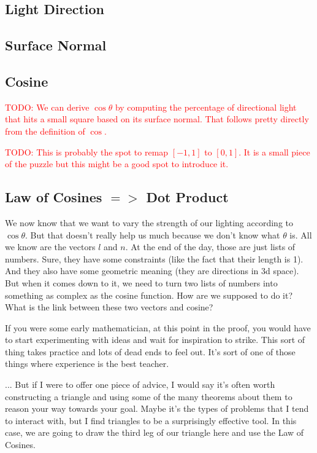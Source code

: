 \documentclass{article}
\newcommand\todo[1]{\textcolor{red}{TODO: #1}}
\begin{document}
\subsection{Light Direction}

\subsection{Surface Normal}

\subsection{Cosine}

\todo{We can derive $\cos \theta$ by computing the percentage of directional light that hits a small square based on its surface normal.
That follows pretty directly from the definition of $\cos$.}

\todo{This is probably the spot to remap $[-1, 1]$ to $[0, 1]$. It is a small piece of the puzzle but this might be a good spot to introduce it.}

\subsection{Law of Cosines $=>$ Dot Product}

We now know that we want to vary the strength of our lighting according to $\cos \theta$.
But that doesn't really help us much because we don't know what $\theta$ is.
All we know are the vectors $l$ and $n$.
At the end of the day, those are just lists of numbers.
Sure, they have some constraints (like the fact that their length is 1).
And they also have some geometric meaning (they are directions in 3d space).
But when it comes down to it, we need to turn two lists of numbers into something as complex as the cosine function.
How are we supposed to do it?
What is the link between these two vectors and cosine?

If you were some early mathematician, at this point in the proof, you would have to start experimenting with ideas and wait for inspiration to strike.
This sort of thing takes practice and lots of dead ends to feel out.
It's sort of one of those things where experience is the best teacher.

... But if I were to offer one piece of advice, I would say it's often worth constructing a triangle and using some of the many theorems about them to reason your way towards your goal.
Maybe it's the types of problems that I tend to interact with, but I find triangles to be a surprisingly effective tool.
In this case, we are going to draw the third leg of our triangle here and use the Law of Cosines.
\end{document}
